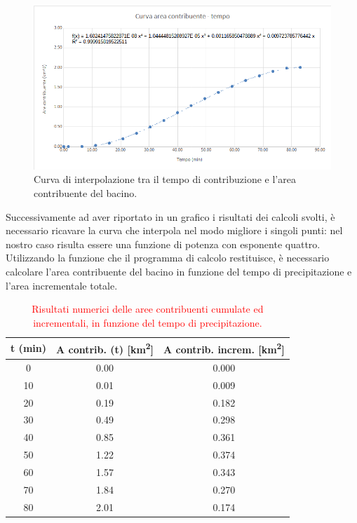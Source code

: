\begin{figure}[H]  \centering
        \includegraphics[scale=0.6]{immagini/curva_area_contribuente_tempo.png}
        \caption{Curva di interpolazione tra il tempo di contribuzione e l'area contribuente del bacino.}
        \label{curva_area_contribuente_tempo}
\end{figure}
Successivamente ad aver riportato in un grafico i risultati dei calcoli svolti, è necessario ricavare la curva che interpola nel modo migliore i singoli punti: nel nostro caso risulta essere una funzione di potenza con esponente quattro.\\
Utilizzando la funzione che il programma di calcolo restituisce, è necessario calcolare l'area contribuente del bacino in funzione del tempo di precipitazione e l'area incrementale totale.
\begin{table}[H] \centering
    \caption{\textcolor{red}{Risultati numerici delle aree contribuenti cumulate ed incrementali, in funzione del tempo di precipitazione.}}
    \begin{tabular}{ccc}
    \toprule
    t (min) & A contrib. (t) [\unit{km^2}]& A contrib. increm. [\unit{km^2}]\\
\midrule
    0       & 0.00               & 0.000                       \\
    10      & 0.01               & 0.009                       \\
    20      & 0.19               & 0.182                       \\
    30      & 0.49               & 0.298                       \\
    40      & 0.85               & 0.361                       \\
    50      & 1.22               & 0.374                       \\
    60      & 1.57               & 0.343                       \\
    70      & 1.84               & 0.270                       \\
    80      & 2.01               & 0.174                       \\
 \bottomrule
 \end{tabular}
 \end{table} 

